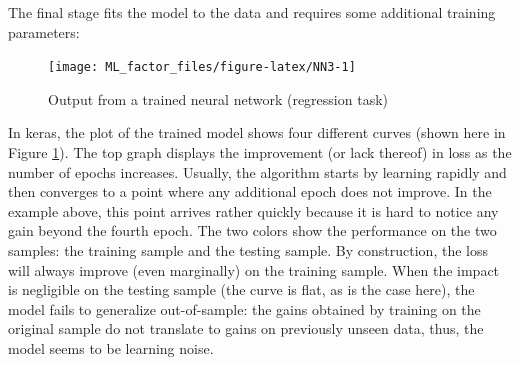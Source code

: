\documentclass[]{krantz}
\makeatletter
\newenvironment{Shaded}{\begin{snugshade}}{\end{snugshade}}
\newcommand{\CommentTok}[1]{\textcolor[rgb]{0.37,0.37,0.37}{\textit{#1}}}
\newcommand{\DataTypeTok}[1]{\textcolor[rgb]{0.27,0.27,0.27}{#1}}
\newcommand{\DecValTok}[1]{\textcolor[rgb]{0.06,0.06,0.06}{#1}}
\newcommand{\KeywordTok}[1]{\textcolor[rgb]{0.27,0.27,0.27}{\textbf{#1}}}
\newcommand{\NormalTok}[1]{#1}
\newcommand{\OperatorTok}[1]{\textcolor[rgb]{0.43,0.43,0.43}{\textbf{#1}}}
\newcommand{\StringTok}[1]{\textcolor[rgb]{0.5,0.5,0.5}{#1}}
\newenvironment{kframe}{%
\medskip{}
\setlength{\fboxsep}{.8em}
 \def\at@end@of@kframe{}%
 \ifinner\ifhmode%
  \def\at@end@of@kframe{\end{minipage}}%
  \begin{minipage}{\columnwidth}%
 \fi\fi%
 \def\FrameCommand##1{\hskip\@totalleftmargin \hskip-\fboxsep
 \colorbox{shadecolor}{##1}\hskip-\fboxsep
     \hskip-\linewidth \hskip-\@totalleftmargin \hskip\columnwidth}%
 \MakeFramed {\advance\hsize-\width
   \@totalleftmargin\z@ \linewidth\hsize
   \@setminipage}}%
 {\par\unskip\endMakeFramed%
 \at@end@of@kframe}
\renewenvironment{Shaded}{\begin{kframe}}{\end{kframe}}
\theoremstyle{definition}
\theoremstyle{definition}
\theoremstyle{definition}
\theoremstyle{remark}
\makeatother
\begin{document}
The final stage fits the model to the data and requires some additional
training parameters:

\footnotesize

\begin{Shaded}
\end{Shaded}

\begin{figure}[H]

{\centering \texttt{[image: ML\_factor\_files/figure-latex/NN3-1]} 

}

\caption{Output from a trained neural network (regression task)}\label{fig:NN3}
\end{figure}

\normalsize

In keras, the plot of the trained model shows four different curves
(shown here in Figure \ref{fig:NN3}). The top graph displays the
improvement (or lack thereof) in loss as the number of epochs increases.
Usually, the algorithm starts by learning rapidly and then converges to
a point where any additional epoch does not improve. In the example
above, this point arrives rather quickly because it is hard to notice
any gain beyond the fourth epoch. The two colors show the performance on
the two samples: the training sample and the testing sample. By
construction, the loss will always improve (even marginally) on the
training sample. When the impact is negligible on the testing sample
(the curve is flat, as is the case here), the model fails to generalize
out-of-sample: the gains obtained by training on the original sample do
not translate to gains on previously unseen data, thus, the model seems
to be learning noise.
\end{document}
